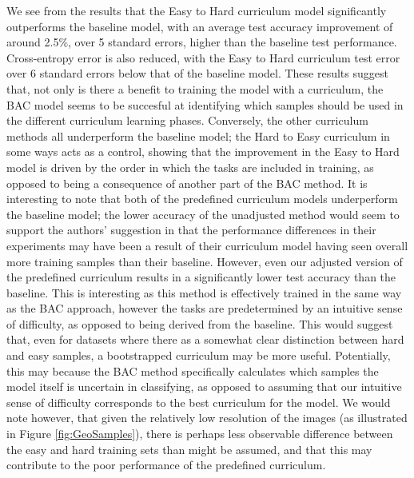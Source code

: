 We see from the results that the Easy to Hard curriculum model significantly outperforms the baseline model, with an average test accuracy improvement of around 2.5\%, over 5 standard errors, higher than the baseline test performance.  Cross-entropy error is also reduced, with the Easy to Hard curriculum test error over 6 standard errors below that of the baseline model. These results suggest that, not only is there a benefit to training the model with a curriculum, the BAC model seems to be succesful at identifying which samples should be used in the different curriculum learning phases. Conversely, the other curriculum methods all underperform the baseline model; the Hard to Easy curriculum in some ways acts as a control, showing that the improvement in the Easy to Hard model is driven by the order in which the tasks are included in training, as opposed to being a consequence of another part of the BAC method. It is interesting to note that both of the predefined curriculum models underperform the baseline model; the lower accuracy of the unadjusted method would seem to support the authors' suggestion in  \cite{Bengio2009} that the performance differences in their experiments may have been a result of their curriculum model having seen overall more training samples than their baseline. However, even our adjusted version of the predefined curriculum results in a significantly lower test accuracy than the baseline. This is interesting as this method is effectively trained in the same way as the BAC approach, however the tasks are predetermined by an intuitive sense of difficulty, as opposed to being derived from the baseline. This would suggest that, even for datasets where there as a somewhat clear distinction between hard and easy samples, a bootstrapped curriculum may be more useful. Potentially, this may because the BAC method specifically calculates which samples the model itself is uncertain in classifying, as opposed to assuming that our intuitive sense of difficulty corresponds to the best curriculum for the model. We would note however, that given the relatively low resolution of the images (as illustrated in Figure \ref{fig:GeoSamples}), there is perhaps less observable difference between the easy and hard training sets than might be assumed, and that this may contribute to the poor performance of the predefined curriculum.

